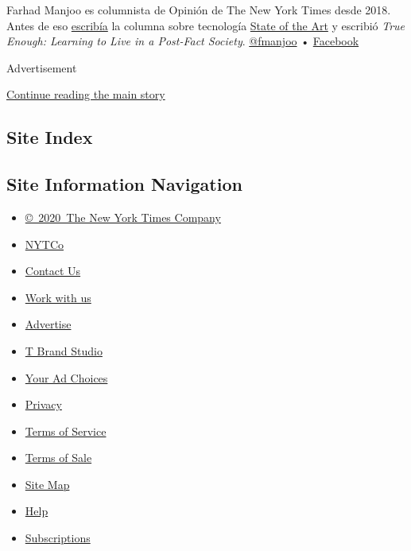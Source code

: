 Farhad Manjoo es columnista de Opinión de The New York Times desde 2018.
Antes de eso
\href{https://www.nytimes3xbfgragh.onion/2019/07/10/opinion/pronoun-they-gender.html}{escribía}
la columna sobre tecnología
\href{https://www.nytimes3xbfgragh.onion/column/state-of-the-art}{State
of the Art} y escribió \emph{True Enough: Learning to Live in a
Post-Fact Society}. \href{https://twitter.com/fmanjoo}{@fmanjoo} •
\href{https://www.facebookcorewwwi.onion/farhad.manjoo}{Facebook}

Advertisement

\protect\hyperlink{after-bottom}{Continue reading the main story}

\hypertarget{site-index}{%
\subsection{Site Index}\label{site-index}}

\hypertarget{site-information-navigation}{%
\subsection{Site Information
Navigation}\label{site-information-navigation}}

\begin{itemize}
\tightlist
\item
  \href{https://help.nytimes3xbfgragh.onion/hc/en-us/articles/115014792127-Copyright-notice}{©~2020~The
  New York Times Company}
\end{itemize}

\begin{itemize}
\tightlist
\item
  \href{https://www.nytco.com/}{NYTCo}
\item
  \href{https://help.nytimes3xbfgragh.onion/hc/en-us/articles/115015385887-Contact-Us}{Contact
  Us}
\item
  \href{https://www.nytco.com/careers/}{Work with us}
\item
  \href{https://nytmediakit.com/}{Advertise}
\item
  \href{http://www.tbrandstudio.com/}{T Brand Studio}
\item
  \href{https://www.nytimes3xbfgragh.onion/privacy/cookie-policy\#how-do-i-manage-trackers}{Your
  Ad Choices}
\item
  \href{https://www.nytimes3xbfgragh.onion/privacy}{Privacy}
\item
  \href{https://help.nytimes3xbfgragh.onion/hc/en-us/articles/115014893428-Terms-of-service}{Terms
  of Service}
\item
  \href{https://help.nytimes3xbfgragh.onion/hc/en-us/articles/115014893968-Terms-of-sale}{Terms
  of Sale}
\item
  \href{https://spiderbites.nytimes3xbfgragh.onion}{Site Map}
\item
  \href{https://help.nytimes3xbfgragh.onion/hc/en-us}{Help}
\item
  \href{https://www.nytimes3xbfgragh.onion/subscription?campaignId=37WXW}{Subscriptions}
\end{itemize}
